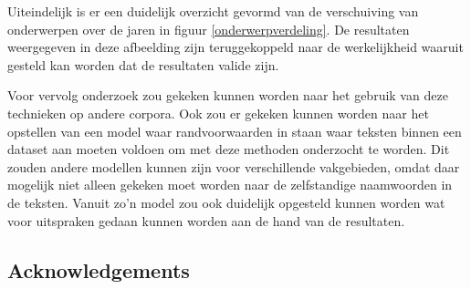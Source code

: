 Uiteindelijk is er een duidelijk overzicht gevormd van de verschuiving van onderwerpen over de jaren in figuur \ref{onderwerpverdeling}. De resultaten weergegeven in deze afbeelding zijn teruggekoppeld naar de werkelijkheid waaruit gesteld kan worden dat de resultaten valide zijn. 

Voor vervolg onderzoek zou gekeken kunnen worden naar het gebruik van deze technieken op andere corpora. Ook zou er gekeken kunnen worden naar het opstellen van een model waar randvoorwaarden in staan waar teksten binnen een dataset aan moeten voldoen om met deze methoden onderzocht te worden. Dit zouden andere modellen kunnen zijn voor verschillende vakgebieden, omdat daar mogelijk niet alleen gekeken moet worden naar de zelfstandige naamwoorden in de teksten. Vanuit zo'n model zou ook duidelijk opgesteld kunnen worden wat voor uitspraken gedaan kunnen worden aan de hand van de resultaten.


\subsection{Acknowledgements}
